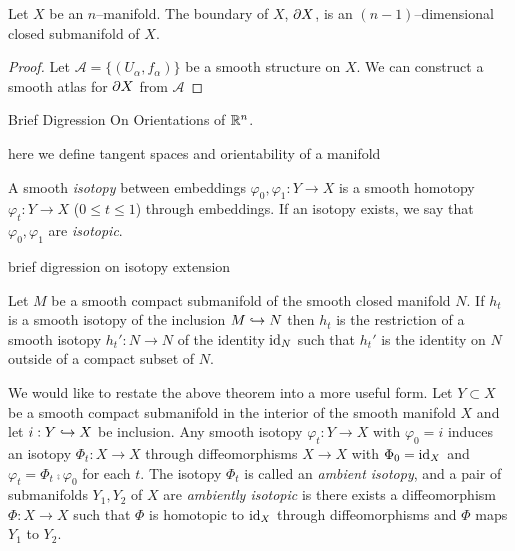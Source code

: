 \begin{prop}
	\label{prop:boundariesaremanifolds}
	Let $X$ be an $n$--manifold.
	The boundary of $X$, $\partial X$, is an $(n-1)$--dimensional closed submanifold of $X$.
\end{prop}

\begin{proof}
	Let $\mathcal{A} = \{(U_\alpha, f_\alpha)\}$ be a smooth structure on $X$.
	We can construct a smooth atlas for $\partial X$ from $\mathcal{A}$
	
\end{proof}

Brief Digression On Orientations of $\mathbb{R}^n$.

\begin{defn}
	\label{def:orient}
	
	here we define tangent spaces and orientability of a manifold
	
\end{defn}

\begin{defn}
	\label{def:isotopy}
	
	A smooth \emph{isotopy} between embeddings $\varphi_0,\varphi_1:Y\to X$ is a smooth homotopy $\varphi_t: Y \to X$ ($0\leq t\leq 1$) through embeddings.
	If an isotopy exists, we say that $\varphi_0,\varphi_1$ are \emph{isotopic}.
	
\end{defn}

brief digression on isotopy extension

\begin{theorem}
	\label{thm:isotopyextension}
	
	Let $M$ be a smooth compact submanifold of the smooth closed manifold $N$.
	If $h_t$ is a smooth isotopy of the inclusion $M\hookrightarrow N$ then $h_t$ is the restriction of a smooth isotopy $h_t':N\to N$ of the identity $\textrm{id}_{N}$ such that $h_t'$ is the identity on $N$ outside of a compact subset of $N$.
	
\end{theorem}

We would like to restate the above theorem into a more useful form.
Let $Y\subset X$ be a smooth compact submanifold in the interior of the smooth manifold $X$ and let $i:Y\hookrightarrow X$ be inclusion.
Any smooth isotopy $\varphi_t:Y\to X$ with $\varphi_0=i$ induces an isotopy $\Phi_t:X\to X$ through diffeomorphisms $X\to X$ with $\Phi_0=\textrm{id}_{X}$ and $\varphi_t=\Phi_t\comp\varphi_0$ for each $t$.
The isotopy $\Phi_t$ is called an \emph{ambient isotopy}, and a pair of submanifolds $Y_1,Y_2$ of $X$ are \emph{ambiently isotopic} is there exists a diffeomorphism $\Phi:X\to X$ such that $\Phi$ is homotopic to $\textrm{id}_{X}$ through diffeomorphisms and $\Phi$ maps $Y_1$ to $Y_2$.
